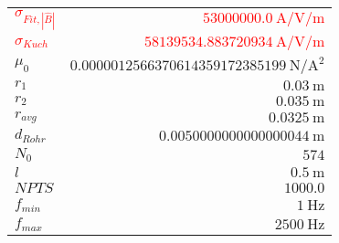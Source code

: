 
{%
    \begin{center}
    \label{tab:fitparams:cu:freq:approx}
    \begin{tabular}{lr}
    \toprule
        \textcolor{red}{$\sigma_{Fit,|\hat{B}|}$} & \textcolor{red}{$\SI{53000000.0}{\ampere\per\volt\per\meter}$}\\
        \textcolor{red}{$\sigma_{Kuch}$} & \textcolor{red}{$\SI{58139534.883720934}{\ampere\per\volt\per\meter}$}\\
        $\mu_0$ & $\SI{0.0000012566370614359172385199}{\newton\per\ampere\squared}$\\
        $r_1$ & $\SI{0.03}{\meter}$\\
        $r_2$ & $\SI{0.035}{\meter}$\\
        $r_{avg}$ & $\SI{0.0325}{\meter}$\\
        $d_{Rohr}$ & $\SI{0.0050000000000000044}{\meter}$\\
        $N_0$ & $\num{574}$\\
        $l$ & $\SI{0.5}{\meter}$\\
        $NPTS$ & $\num{1000.0}$\\
        $f_{min}$ & $\SI{1}{\hertz}$\\
        $f_{max}$ & $\SI{2500}{\hertz}$\\

    \bottomrule
    \end{tabular}
    \end{center}
}

